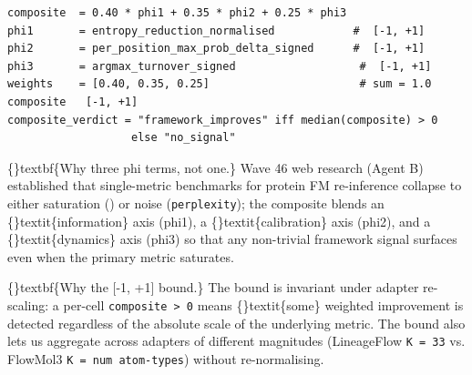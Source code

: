 \documentclass{article}
\begin{document}
\begin{verbatim}
composite  = 0.40 * phi1 + 0.35 * phi2 + 0.25 * phi3
phi1       = entropy_reduction_normalised            #  [-1, +1]
phi2       = per_position_max_prob_delta_signed      #  [-1, +1]
phi3       = argmax_turnover_signed                   #  [-1, +1]
weights    = [0.40, 0.35, 0.25]                       # sum = 1.0
composite   [-1, +1]
composite_verdict = "framework_improves" iff median(composite) > 0
                   else "no_signal"
\end{verbatim}
\begin{table}[ht]
\centering
\small
{}
\end{table}

\{\}textbf\{Why three phi terms, not one.\} Wave 46 web research (Agent B) established that single-metric benchmarks for protein FM re-inference collapse to either saturation () or noise (\texttt{perplexity}); the composite blends an \{\}textit\{information\} axis (phi1), a \{\}textit\{calibration\} axis (phi2), and a \{\}textit\{dynamics\} axis (phi3) so that any non-trivial framework signal surfaces even when the primary metric saturates.

\{\}textbf\{Why the [-1, +1] bound.\} The bound is invariant under adapter re-scaling: a per-cell \texttt{composite > 0} means \{\}textit\{some\} weighted improvement is detected regardless of the absolute scale of the underlying metric. The bound also lets us aggregate across adapters of different magnitudes (LineageFlow \texttt{K = 33} vs. FlowMol3 \texttt{K = num atom-types}) without re-normalising.
\end{document}

